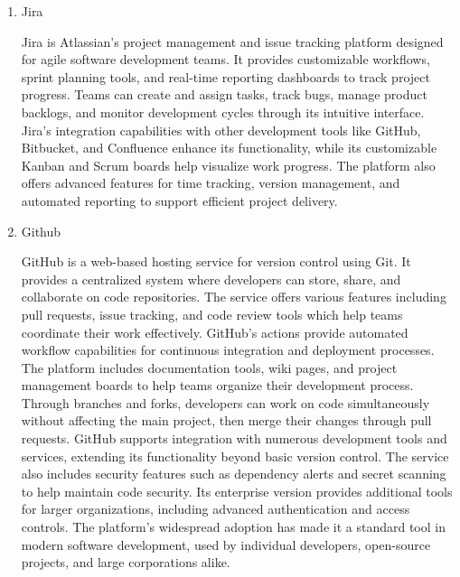 \documentclass[conference]{IEEEtran}
\begin{document}
\begin{enumerate}[label=\arabic*]
    \vspace{1em}

    \item Jira\par
    \vspace{0.3em}
    Jira is Atlassian's project management and issue tracking platform designed for agile software development teams. It provides customizable workflows, sprint planning tools, and real-time reporting dashboards to track project progress. Teams can create and assign tasks, track bugs, manage product backlogs, and monitor development cycles through its intuitive interface. Jira's integration capabilities with other development tools like GitHub, Bitbucket, and Confluence enhance its functionality, while its customizable Kanban and Scrum boards help visualize work progress. The platform also offers advanced features for time tracking, version management, and automated reporting to support efficient project delivery.

    \vspace{1em}

    \item Github\par
    \vspace{0.3em}
    GitHub is a web-based hosting service for version control using Git. It provides a centralized system where developers can store, share, and collaborate on code repositories. The service offers various features including pull requests, issue tracking, and code review tools which help teams coordinate their work effectively. GitHub's actions provide automated workflow capabilities for continuous integration and deployment processes. The platform includes documentation tools, wiki pages, and project management boards to help teams organize their development process. Through branches and forks, developers can work on code simultaneously without affecting the main project, then merge their changes through pull requests. GitHub supports integration with numerous development tools and services, extending its functionality beyond basic version control. The service also includes security features such as dependency alerts and secret scanning to help maintain code security. Its enterprise version provides additional tools for larger organizations, including advanced authentication and access controls. The platform's widespread adoption has made it a standard tool in modern software development, used by individual developers, open-source projects, and large corporations alike.


\end{enumerate}
\end{document}
